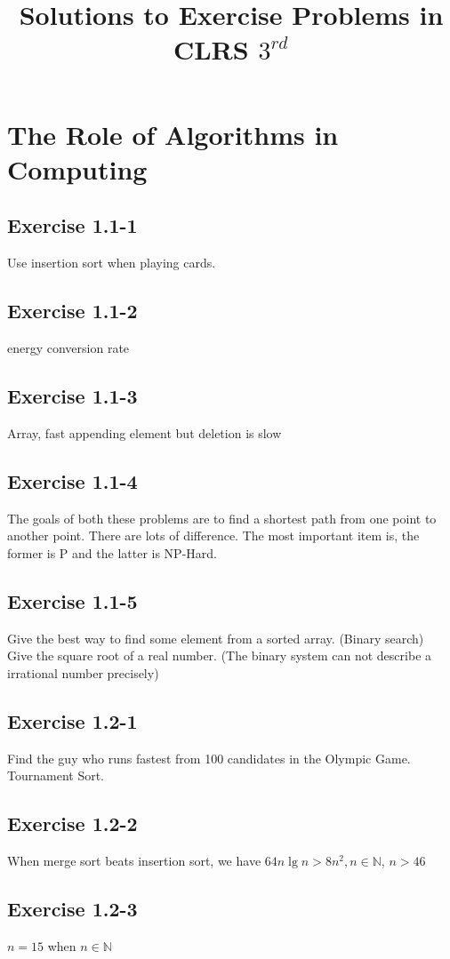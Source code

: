 \documentclass[12pt]{article}
\theoremstyle{definition}
\theoremstyle{remark}
\begin{document}
\title{Solutions to Exercise Problems in CLRS $3^{rd}$}%
\maketitle
\section{The Role of Algorithms in Computing}
\subsection*{Exercise 1.1-1}
Use insertion sort when playing cards.
\subsection*{Exercise 1.1-2}
energy conversion rate
\subsection*{Exercise 1.1-3}
Array, fast appending element but deletion is slow
\subsection*{Exercise 1.1-4}
The goals of both these problems are to find a shortest path from one point to another point. There are lots of difference. The most important item is, the former is P and the latter is NP-Hard.
\subsection*{Exercise 1.1-5}
Give the best way to find some element from a sorted array. (Binary search)\\
Give the square root of a real number. (The binary system can not describe a irrational number precisely)
\subsection*{Exercise 1.2-1}
Find the guy who runs fastest from 100 candidates in the Olympic Game. Tournament Sort.
\subsection*{Exercise 1.2-2}
When merge sort beats insertion sort, we have $64n\lg{n}>8n^2,n\in \mathbb{N}$, $n>46$
\subsection*{Exercise 1.2-3}
$n = 15$ when $n\in \mathbb{N}$
\end{document}
